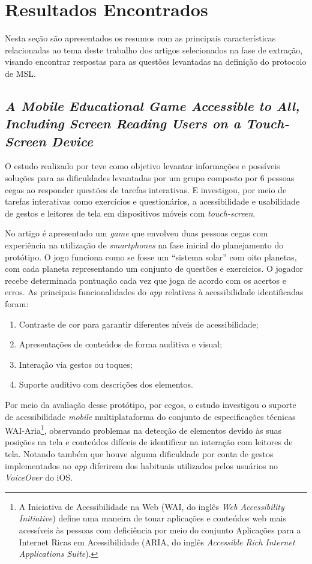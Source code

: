 \newpage{}

\section{Resultados Encontrados}

Nesta seção são apresentados os resumos com as principais características relacionadas ao tema deste trabalho dos artigos selecionados na fase de extração,
visando encontrar respostas para as questões levantadas na definição do protocolo de MSL\@.

\subsection{\emph{A Mobile Educational Game Accessible to All, Including Screen Reading Users on a Touch-Screen Device}}

O estudo realizado por  teve como objetivo levantar informações e possíveis soluções para as dificuldades levantadas por um grupo composto por 6 pessoas cegas ao responder questões de tarefas interativas.
E investigou, por meio de tarefas interativas como exercícios e questionários, a acessibilidade e usabilidade de gestos e leitores de tela em dispositivos móveis com \emph{touch-screen}.

No artigo é apresentado um \emph{game} que envolveu duas pessoas cegas com experiência na utilização de \emph{smartphones} na fase inicial do planejamento do protótipo.
O jogo funciona como se fosse um ``sistema solar'' com oito planetas, com cada planeta representando um conjunto de questões e exercícios.
O jogador recebe determinada pontuação cada vez que joga de acordo com os acertos e erros.
As principais funcionalidades do \emph{app} relativas à acessibilidade identificadas foram:

\begin{enumerate}
    \item Contraste de cor para garantir diferentes níveis de acessibilidade;
    \item Apresentações de conteúdos de forma auditiva e visual;
    \item Interação via gestos ou toques;
    \item Suporte auditivo com descrições dos elementos.
\end{enumerate}

Por meio da avaliação desse protótipo, por cegos, o estudo investigou o suporte de acessibilidade \emph{mobile} multiplataforma do conjunto de especificações
técnicas WAI-Aria\footnote{A Iniciativa de Acessibilidade na Web (WAI, do inglês \emph{Web Accessibility Initiative})
    define uma maneira de tonar aplicações e conteúdos web mais acessíveis às pessoas com deficiência por meio do conjunto
    Aplicações para a Internet Ricas em Acessibilidade (ARIA, do inglês \emph{Accessible Rich Internet Applications Suite}).},
observando problemas na detecção de elementos devido às suas posições na tela e conteúdos difíceis
de identificar na interação com leitores de tela. Notando também que houve alguma dificuldade por
conta de gestos implementados no \emph{app} diferirem dos habituais utilizados pelos usuários no \emph{VoiceOver} do iOS.

